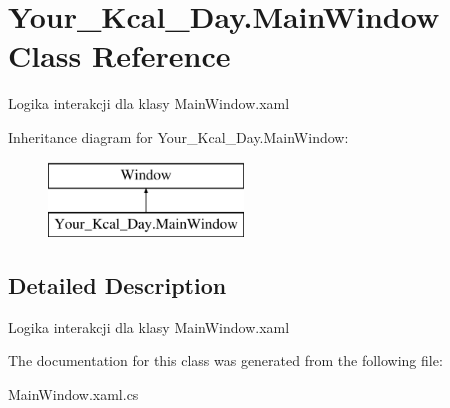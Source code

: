 \hypertarget{class_your___kcal___day_1_1_main_window}{}\section{Your\+\_\+\+Kcal\+\_\+\+Day.\+Main\+Window Class Reference}
\label{class_your___kcal___day_1_1_main_window}


Logika interakcji dla klasy Main\+Window.\+xaml  


Inheritance diagram for Your\+\_\+\+Kcal\+\_\+\+Day.\+Main\+Window\+:\begin{figure}[H]
\begin{center}
\leavevmode
\includegraphics[height=2.000000cm]{class_your___kcal___day_1_1_main_window}
\end{center}
\end{figure}


\subsection{Detailed Description}
Logika interakcji dla klasy Main\+Window.\+xaml 



The documentation for this class was generated from the following file\+:\begin{DoxyCompactItemize}
\item 
Main\+Window.\+xaml.\+cs\end{DoxyCompactItemize}

